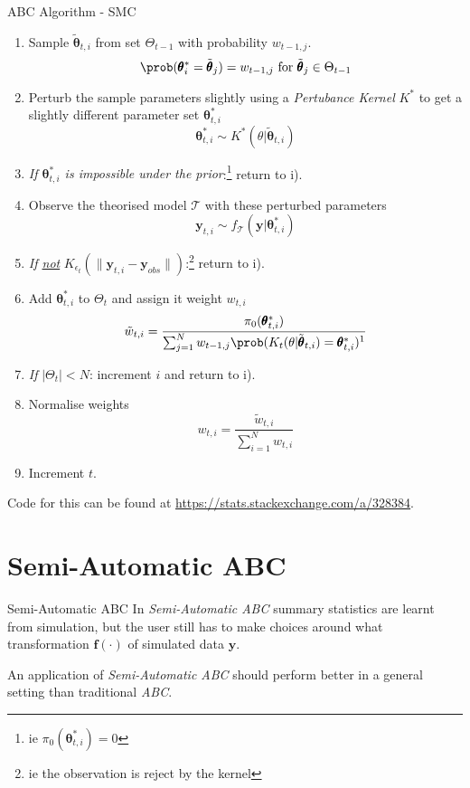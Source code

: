 \documentclass[11pt,a4paper]{article}
\begin{document}
\begin{proposition}{ABC Algorithm - SMC\cite{Delayed_Acceptance_ABC_SMC}\cite{youtube_ABC_intro}\cite{doi:10.1098/rsif.2008.0172}}
\begin{itemize}
      \begin{enumerate}
        \item Sample $\tilde{\pmb\theta}_{t,i}$ from set $\Theta_{t-1}$ with probability $w_{t-1,j}$.
          \[ \prob(\pmb\theta_i^*=\tilde{\pmb\theta}_j)=w_{t-1,j}\text{ for }\tilde{\pmb\theta}_j\in\Theta_{t-1} \]
        \item Perturb the sample parameters slightly using a \textit{Pertubance Kernel} $K^*$ to get a slightly different parameter set $\pmb\theta^*_{t,i}$
          \[ \pmb\theta^*_{t,i}\sim K^*(\theta|\tilde{\pmb\theta}_{t,i}) \]
        \item \textit{If $\pmb\theta^*_{t,i}$ is impossible under the prior}:\footnote{ie $\pi_0(\pmb\theta^*_{t,i})=0$} return to i).
        \item Observe the theorised model $\mathcal{T}$ with these perturbed parameters
          \[ \mathbf{y}_{t,i}\sim f_\mathcal{T}(\mathbf{y}|\pmb\theta^*_{t,i}) \]
        \item \textit{If \underline{not} }$K_{\epsilon_t}(\|\mathbf{y}_{t,i}-\mathbf{y}_{obs}\|)$:\footnote{ie the observation is reject by the kernel} return to i).
        \item Add $\pmb\theta_{t,i}^*$ to $\Theta_t$ and assign it weight $w_{t,i}$
        \[ \tilde{w}_{t,i}=\frac{\pi_0(\pmb\theta_{t,i}^*)}{\sum_{j=1}^Nw_{t-1,j}\prob(K_t(\theta|\tilde{\pmb\theta}_{t,i})=\pmb\theta_{t,i}^*)\footnotemark} \]
        \item \textit{If }$|\Theta_t|<N$: increment $i$ and return to i).
        \item Normalise weights
        \[ w_{t,i}=\frac{\tilde{w}_{t,i}}{\sum_{i=1}^Nw_{t,i}} \]
        \item Increment $t$.
      \end{enumerate}
    \end{itemize}
    Code for this can be found at \url{https://stats.stackexchange.com/a/328384}.
  \end{proposition}

\section{Semi-Automatic ABC}

  \begin{definition}{Semi-Automatic ABC\cite{Constructing_Summary_Statistics_For_ABC}}
    In \textit{Semi-Automatic ABC} summary statistics are learnt from simulation, but the user still has to make choices around what transformation $\mathbf{f}(\cdot)$ of simulated data $\mathbf{y}$.
    \par An application of \textit{Semi-Automatic ABC} should perform better in a general setting than traditional \textit{ABC}.
  \end{definition}
\end{document}
